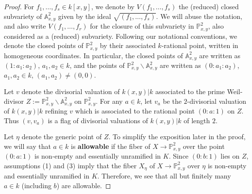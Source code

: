 \documentclass[11pt]{amsart}
\theoremstyle{definition}
\theoremstyle{remark}
\numberwithin{equation}{section}
\newcommand{\Abb}{\mathbb{A}}
\newcommand{\Pbb}{\mathbb{P}}
\begin{document}
\begin{proof}
  For $f_1,\ldots,f_s \in k[x,y]$, we denote by $V(f_1,\ldots,f_s)$ the (reduced) closed subvariety of $\Abb^2_{x,y}$ given by the ideal $\sqrt{(f_1,\ldots,f_s)}$.
  We will abuse the notation, and also write $V(f_1,\ldots,f_r)$ for the closure of this subvariety in $\Pbb^2_{x,y}$, also considered as a (reduced) subvariety.
  Following our notational conventions, we denote the closed points of $\Pbb^2_{x,y}$ by their associated $k$-rational point, written in homogeneous coordinates.
  In particular, the closed points of $\Abb^2_{x,y}$ are written as $(1:a_1:a_2)$, $a_1,a_2 \in k$, and the points of $\Pbb^2_{x,y} \smallsetminus \Abb^2_{x,y}$ are written as $(0:a_1:a_2)$, $a_1,a_2 \in k$, $(a_1,a_2) \neq (0,0)$.

  Let $v$ denote the divisorial valuation of $k(x,y)|k$ associated to the prime Weil-divisor $Z := \Pbb^2_{x,y} \smallsetminus \Abb^2_{x,y}$ on $\Pbb^2_{x,y}$.
  For any $a \in k$, let $v_a$ be the $2$-divisorial valuation of $k(x,y)|k$ refining $v$ which is associated to the rational point $(0:a:1)$ on $Z$.
  Thus $(v,v_a)$ is a flag of divisorial valuations of $k(x,y)|k$ of length $2$.

  Let $\eta$ denote the generic point of $Z$.
  To simplify the exposition later in the proof, we will say that $a \in k$ is {\bf allowable} if the fiber of $X \rightarrow \Pbb^2_{x,y}$ over the point $(0:a:1)$ is non-empty and essentially unramified in $K$.
  Since $(0:b:1)$ lies on $Z$, assumptions (1) and (3) imply that the fiber $X_\eta$ of $X \rightarrow \Pbb^2_{x,y}$ over $\eta$ is non-empty and essentially unramified in $K$.
  Therefore, we see that all but finitely many $a \in k$ (including $b$) are allowable.


\end{proof}
\end{document}
